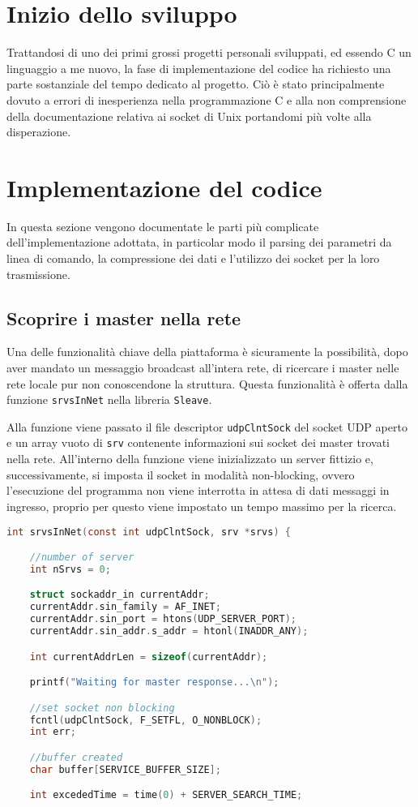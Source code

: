 \documentclass[11pt,fleqn]{book} %
\begin{document}
\section{Inizio dello sviluppo}
Trattandosi di uno dei primi grossi progetti personali sviluppati, ed essendo C un linguaggio a me nuovo, la fase di implementazione del codice ha richiesto una parte sostanziale del tempo dedicato al progetto.
Ciò è stato principalmente dovuto a errori di inesperienza nella programmazione C e alla non comprensione della documentazione relativa ai socket di Unix portandomi più volte alla disperazione.


\section{Implementazione del codice}
In questa sezione vengono documentate le parti più complicate dell'implementazione adottata, in particolar modo il parsing dei parametri da linea di comando, la compressione dei dati e l'utilizzo dei socket per la loro trasmissione.

\subsection{Scoprire i master nella rete}
Una delle funzionalità chiave della piattaforma è sicuramente la possibilità, dopo aver mandato un messaggio broadcast all'intera rete, di ricercare i master nelle rete locale pur non conoscendone la struttura. Questa funzionalità è offerta dalla funzione \texttt{srvsInNet} nella libreria \texttt{Sleave}.

Alla funzione viene passato il file descriptor \texttt{udpClntSock} del socket UDP aperto e un array vuoto di \texttt{srv} contenente informazioni sui socket dei master trovati nella rete.
All'interno della funzione viene inizializzato un server fittizio e, successivamente, si imposta il socket in modalità non-blocking, ovvero l'esecuzione del programma non viene interrotta in attesa di dati messaggi in ingresso, proprio per questo viene impostato un tempo massimo per la ricerca.
\begin{lstlisting}[language=C]
int srvsInNet(const int udpClntSock, srv *srvs) {

	//number of server
	int nSrvs = 0;

	struct sockaddr_in currentAddr;
	currentAddr.sin_family = AF_INET;
	currentAddr.sin_port = htons(UDP_SERVER_PORT);
	currentAddr.sin_addr.s_addr = htonl(INADDR_ANY);

	int currentAddrLen = sizeof(currentAddr);

	printf("Waiting for master response...\n");

	//set socket non blocking
	fcntl(udpClntSock, F_SETFL, O_NONBLOCK);
	int err;

	//buffer created
	char buffer[SERVICE_BUFFER_SIZE];

	int excededTime = time(0) + SERVER_SEARCH_TIME;
\end{lstlisting}
\end{document}
